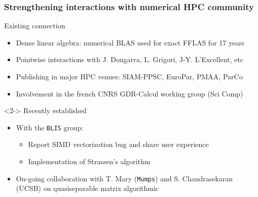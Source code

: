 \documentclass{beamer}
\begin{document}
\begin{frame}
  \frametitle{Strengthening interactions with numerical HPC community}
  \begin{block}  {Existing connection}
    \begin{itemize}
    \item Dense linear algebra: numerical BLAS used for exact FFLAS for 17 years
    \item Pointwise interactions with J. Dongarra, L. Grigori, J-Y. L'Excellent,  etc
    \item Publishing in major HPC venues:
      SIAM-PPSC, EuroPar, PMAA, ParCo
    \item Involvement in the french CNRS GDR-Calcul  working group (Sci Comp)
    \end{itemize}
  \end{block}
  \begin{block}<2->  {Recently established}
    \begin{itemize}
    \item With the \texttt{BLIS} group:
      \begin{itemize}
      \item Report SIMD vectorization bug and share user experience
      \item Implementation of Strassen's algorithm
      \end{itemize}
    \item On-going collaboration with T. Mary (\texttt{Mumps}) and
        S. Chandrasekaran (UCSB) on quasiseparable matrix algorithmic
    \end{itemize}
  \end{block}
\end{frame}
\end{document}
